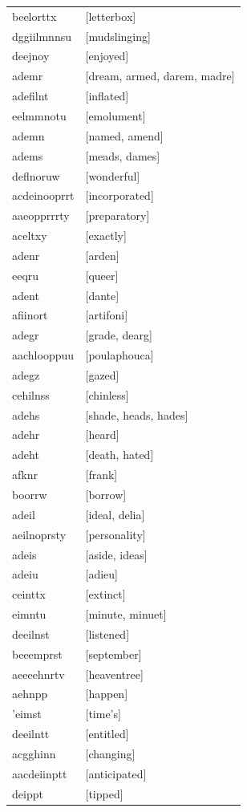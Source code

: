 \documentclass{article}
\begin{document}
\begin{tabular}{ll}
beelorttx & [letterbox] \\
dggiilmnnsu & [mudslinging] \\
deejnoy & [enjoyed] \\
ademr & [dream, armed, darem, madre] \\
adefilnt & [inflated] \\
eelmmnotu & [emolument] \\
ademn & [named, amend] \\
adems & [meads, dames] \\
deflnoruw & [wonderful] \\
acdeinooprrt & [incorporated] \\
aaeopprrrty & [preparatory] \\
aceltxy & [exactly] \\
adenr & [arden] \\
eeqru & [queer] \\
adent & [dante] \\
afiinort & [artifoni] \\
adegr & [grade, dearg] \\
aachlooppuu & [poulaphouca] \\
adegz & [gazed] \\
cehilnss & [chinless] \\
adehs & [shade, heads, hades] \\
adehr & [heard] \\
adeht & [death, hated] \\
afknr & [frank] \\
boorrw & [borrow] \\
adeil & [ideal, delia] \\
aeilnoprsty & [personality] \\
adeis & [aside, ideas] \\
adeiu & [adieu] \\
ceinttx & [extinct] \\
eimntu & [minute, minuet] \\
deeilnst & [listened] \\
beeemprst & [september] \\
aeeeehnrtv & [heaventree] \\
aehnpp & [happen] \\
'eimst & [time's] \\
deeilntt & [entitled] \\
acgghinn & [changing] \\
aacdeiinptt & [anticipated] \\
deippt & [tipped] \\

\end{tabular}
\end{document}
